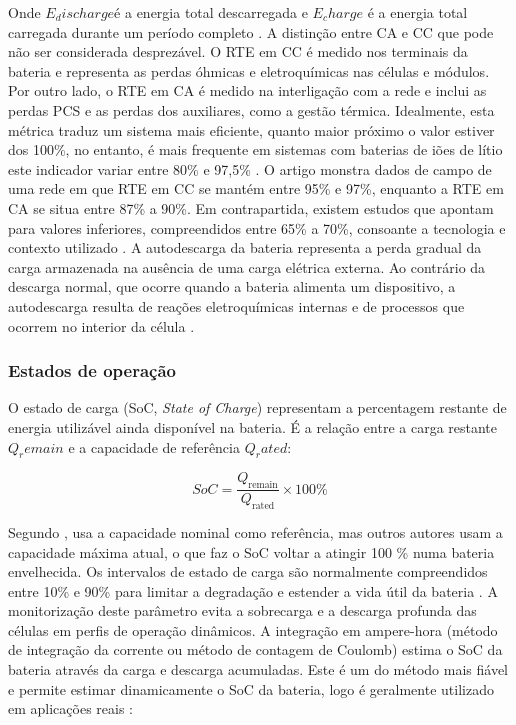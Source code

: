 Onde $E_discharge$é a energia total descarregada e $E_charge$ é a energia total carregada durante um período completo \cite{ Kyeremeh2026}. A distinção entre CA e CC que pode não ser considerada desprezável. O RTE em CC é medido nos terminais da bateria e representa as perdas óhmicas e eletroquímicas nas células e módulos. Por outro lado, o RTE em CA é medido na interligação com a rede e inclui as perdas PCS e as perdas dos auxiliares, como a gestão térmica. 
Idealmente, esta métrica traduz um sistema mais eficiente, quanto maior próximo o valor estiver dos 100\%, no entanto, é mais frequente em sistemas com baterias de iões de lítio este indicador variar entre 80\% e 97,5\% \cite{ Lin2023} . O artigo \cite{ Kyeremeh2026} monstra dados de campo de uma rede em que RTE em CC se mantém entre 95\% e 97\%, enquanto a RTE em CA se situa entre 87\% a 90\%. Em contrapartida, existem estudos que apontam para valores inferiores, compreendidos entre 65\% a 70\%, consoante a tecnologia e contexto utilizado \cite{ Safarzadeh2026}\cite{ Kyeremeh2026}.
A autodescarga da bateria representa a perda gradual da carga armazenada na ausência de uma carga elétrica externa. Ao contrário da descarga normal, que ocorre quando a bateria alimenta um dispositivo, a autodescarga resulta de reações eletroquímicas internas e de processos que ocorrem no interior da célula \cite{ BetterTechnologyGroupLimited2026}.

\subsubsection{Estados de operação}
\label{sec:Ch2.1.5.2}

O estado de carga (SoC, \textit{State of Charge}) representam a percentagem restante de energia utilizável ainda disponível na bateria. É a relação entre a carga restante $Q_remain$ e a capacidade de referência $Q_rated$:


\[
SoC = \frac{Q_{\text{remain}}}{Q_{\text{rated}}} \times 100\%
\]

Segundo \textcite{ Zhao2023}, usa a capacidade nominal como referência, mas outros autores usam a capacidade máxima atual, o que faz o SoC voltar a atingir 100 \% numa bateria envelhecida. Os intervalos de estado de carga são normalmente compreendidos entre 10\% e 90\% para limitar a degradação e estender a vida útil da bateria \cite{ Safarzadeh2026}. A monitorização deste parâmetro evita a sobrecarga e a descarga profunda das células em perfis de operação dinâmicos.
A integração em ampere-hora (método de integração da corrente ou método de contagem de Coulomb) estima o SoC da bateria através da carga e descarga acumuladas. Este é um do método mais fiável e permite estimar dinamicamente o SoC da bateria, logo é geralmente utilizado em aplicações reais \cite{ Zhao2023}:



